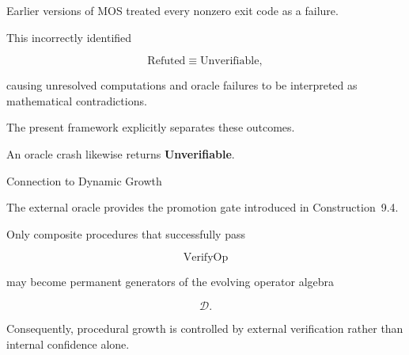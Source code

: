 

\begin{highlightbox}


\BodyFont

Earlier versions of MOS treated every nonzero exit code as a failure.

This incorrectly identified

\[
\boxed{
\text{Refuted}
\equiv
\text{Unverifiable},
}
\]

causing unresolved computations and oracle failures to be interpreted as
mathematical contradictions.

The present framework explicitly separates these outcomes.

An oracle crash likewise returns
\textbf{Unverifiable}.

\end{highlightbox}


\begin{mosbox}{Connection to Dynamic Growth}

\BodyFont

The external oracle provides the promotion gate introduced in
Construction~9.4.

Only composite procedures that successfully pass

\[
\boxed{
\mathrm{VerifyOp}
}
\]

may become permanent generators of the evolving operator algebra

\[
\mathcal D.
\]

Consequently, procedural growth is controlled by external verification
rather than internal confidence alone.

\end{mosbox}

